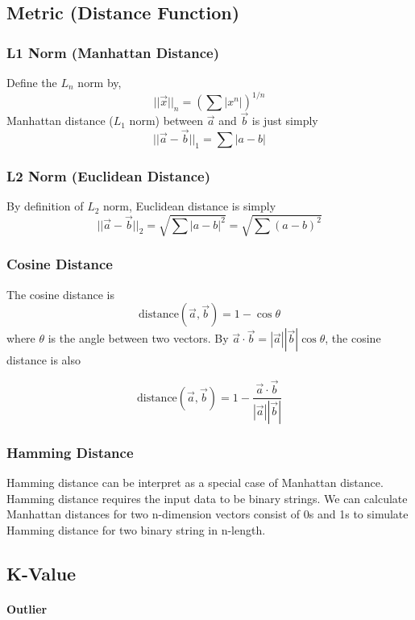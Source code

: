 \documentclass{note}
\begin{document}
\subsection{Metric (Distance Function)}
\label{sec:metric}

\subsubsection{L1 Norm (Manhattan Distance)}

Define the $L_n$ norm by, 
$$
||\vec{x}||_n = (\sum |x^n|)^{1/n}
$$
Manhattan distance ($L_1$ norm) between $\vec{a}$ and $\vec{b}$ is just simply
$$
||\vec{a} - \vec{b}||_1 = \sum |a - b|
$$

\subsubsection{L2 Norm (Euclidean Distance)}

By definition of $L_2$ norm, Euclidean distance is simply
$$
||\vec{a} - \vec{b}||_2 = \sqrt{\sum |a - b|^2} = \sqrt{\sum(a - b)^2}
$$

\subsubsection{Cosine Distance}

The cosine distance is
$$
\text{distance}(\vec{a}, \vec{b}) = 1 - \cos\theta
$$
where $\theta$ is the angle between two vectors. By $\vec{a} \cdot \vec{b} = |\vec{a}||\vec{b}|\cos\theta$, the cosine distance is also

$$
\text{distance}(\vec{a}, \vec{b}) = 1 - \frac{\vec{a} \cdot \vec{b}}{|\vec{a}||\vec{b}|}
$$

\subsubsection{Hamming Distance}

Hamming distance can be interpret as a special case of Manhattan distance. Hamming distance requires the input data to be binary strings. We can calculate Manhattan distances for two n-dimension vectors consist of 0s and 1s to simulate Hamming distance for two binary string in n-length.  

\subsection{K-Value}

\paragraph{Outlier}
\end{document}
